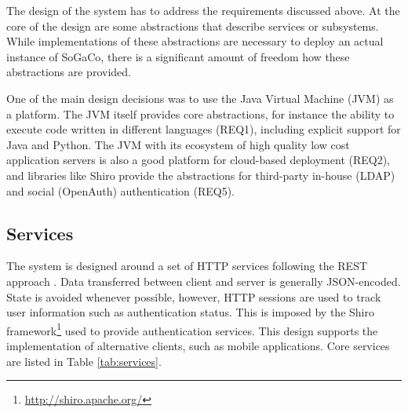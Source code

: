 The design of the system has to address the requirements discussed above. At the core of the design are some abstractions that describe services or subsystems. While implementations of these abstractions are necessary to deploy an actual instance of SoGaCo, there is a significant amount of freedom how these abstractions are provided.

One of the main design decisions was to use the Java Virtual Machine (JVM) \cite{lindholm2014java} as a platform. The JVM itself provides core abstractions, for instance the ability to execute code written in different languages (REQ1), including explicit support for Java and Python. The JVM with its ecosystem of high quality low cost application servers is also a good platform for cloud-based deployment (REQ2), and libraries like Shiro provide the abstractions for third-party in-house (LDAP) and social (OpenAuth) authentication (REQ5). 

\subsection{Services}

The system is designed around a set of HTTP services following the REST approach \cite{fielding2000architectural}. Data transferred between client and server is generally JSON-encoded. State is avoided whenever possible, however, HTTP sessions are used to track user information such as authentication status. This is imposed by the Shiro framework\footnote{\url{http://shiro.apache.org/}} used to provide authentication services. This design supports the implementation of alternative clients, such as mobile applications. Core services are listed in Table \ref{tab:services}.


